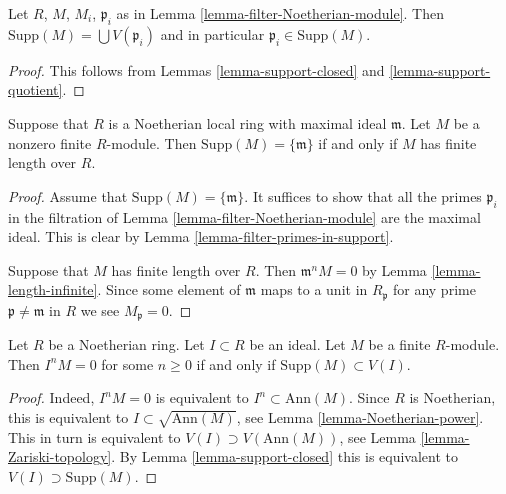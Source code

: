 \begin{lemma}
\label{lemma-filter-primes-in-support}
Let $R$, $M$, $M_i$, $\mathfrak p_i$ as in
Lemma \ref{lemma-filter-Noetherian-module}.
Then $\text{Supp}(M) = \bigcup V(\mathfrak p_i)$
and in particular $\mathfrak p_i \in \text{Supp}(M)$.
\end{lemma}

\begin{proof}
This follows from Lemmas \ref{lemma-support-closed} and
\ref{lemma-support-quotient}.
\end{proof}

\begin{lemma}
\label{lemma-support-point}
Suppose that $R$ is a Noetherian local ring with
maximal ideal $\mathfrak m$. Let $M$ be a nonzero finite
$R$-module. Then $\text{Supp}(M) = \{ \mathfrak m\}$
if and only if $M$ has finite length over $R$.
\end{lemma}

\begin{proof}
Assume that $\text{Supp}(M) = \{ \mathfrak m\}$.
It suffices to show that all the primes $\mathfrak p_i$
in the filtration of Lemma \ref{lemma-filter-Noetherian-module}
are the maximal ideal. This is clear by
Lemma \ref{lemma-filter-primes-in-support}.

\medskip\noindent
Suppose that $M$ has finite length over $R$.
Then $\mathfrak m^n M = 0$ by Lemma \ref{lemma-length-infinite}.
Since some element of $\mathfrak m$ maps to a unit
in $R_{\mathfrak p}$ for any prime
$\mathfrak p \not = \mathfrak m$ in $R$ we see $M_{\mathfrak p} = 0$.
\end{proof}

\begin{lemma}
\label{lemma-Noetherian-power-ideal-kills-module}
Let $R$ be a Noetherian ring.
Let $I \subset R$ be an ideal.
Let $M$ be a finite $R$-module.
Then $I^nM = 0$ for some $n \geq 0$ if and only if
$\text{Supp}(M) \subset V(I)$.
\end{lemma}

\begin{proof}
Indeed, $I^nM = 0$ is equivalent to $I^n \subset \text{Ann}(M)$.
Since $R$ is Noetherian, this is equivalent to
$I \subset \sqrt{\text{Ann}(M)}$, see
Lemma \ref{lemma-Noetherian-power}.
This in turn is equivalent to $V(I) \supset V(\text{Ann}(M))$, see
Lemma \ref{lemma-Zariski-topology}.
By Lemma \ref{lemma-support-closed}
this is equivalent to $V(I) \supset \text{Supp}(M)$.
\end{proof}

